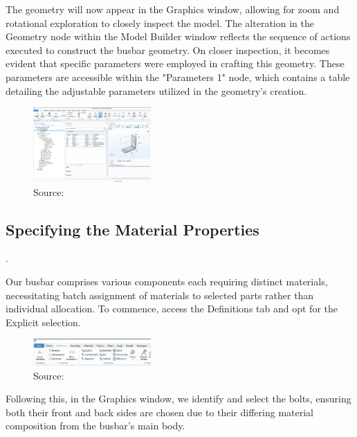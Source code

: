 The geometry will now appear in the Graphics window, allowing for zoom and rotational exploration to closely inspect the model. The alteration in the Geometry node within the Model Builder window reflects the sequence of actions executed to construct the busbar geometry. On closer inspection, it becomes evident that specific parameters were employed in crafting this geometry. These parameters are accessible within the "Parameters 1" node, which contains a table detailing the adjustable parameters utilized in the geometry's creation.

\begin{figure}[ht!]
  \centering
  \includegraphics[width=0.4\textwidth]{Chapters/Figures/Chapter 3 Figures/Initial Busbar Geom.png}
  \caption{ Source: \cite{}}
  \label{}
\end{figure}

\subsection{Specifying the Material Properties}.

Our busbar comprises various components each requiring distinct materials, necessitating batch assignment of materials to selected parts rather than individual allocation. To commence, access the Definitions tab and opt for the Explicit selection.

\begin{figure}[ht!]
  \centering
  \includegraphics[width=0.4\textwidth]{Chapters/Figures/Chapter 3 Figures/Explicit Choice Selection from Definitions Tab.png}
  \caption{ Source: \cite{}}
  \label{}
\end{figure}

Following this, in the Graphics window, we identify and select the bolts, ensuring both their front and back sides are chosen due to their differing material composition from the busbar's main body.

